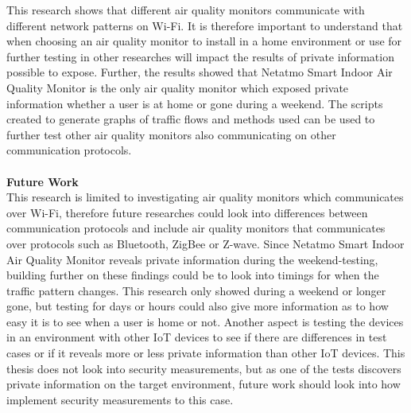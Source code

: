 This research shows that different air quality monitors communicate with different network patterns on \gls{Wi-Fi}. It is therefore important to understand that when choosing an air quality monitor to install in a home environment or use for further testing in other researches will impact the results of private information possible to expose. Further, the results showed that Netatmo Smart Indoor Air Quality Monitor is the only air quality monitor which exposed private information whether a user is at home or gone during a weekend. The scripts created to generate graphs of traffic flows and methods used can be used to further test other air quality monitors also communicating on other communication protocols.
\\\\
\textbf{Future Work}
\\
This research is limited to investigating air quality monitors which communicates over \gls{Wi-Fi}, therefore future researches could look into differences between communication protocols and include air quality monitors that communicates over protocols such as Bluetooth, ZigBee or Z-wave. Since Netatmo Smart Indoor Air Quality Monitor reveals private information during the weekend-testing, building further on these findings could be to look into timings for when the traffic pattern changes. This research only showed during a weekend or longer gone, but testing for days or hours could also give more information as to how easy it is to see when a user is home or not. Another aspect is testing the devices in an environment with other \gls{IoT} devices to see if there are differences in test cases or if it reveals more or less private information than other \gls{IoT} devices. This thesis does not look into security measurements, but as one of the tests discovers private information on the target environment, future work should look into how implement security measurements to this case. 
